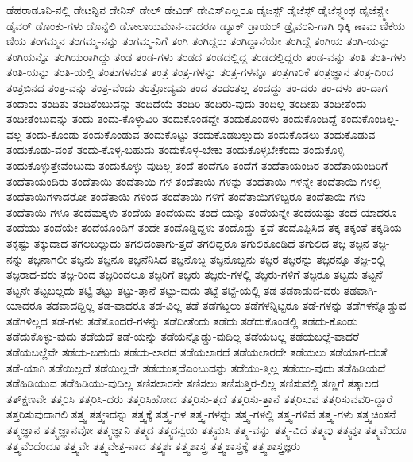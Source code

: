 {ಡೆಹರಾಡೂನಿ-ನಲ್ಲಿ
ಡೇಟನ್ನಿನ
ಡೇನಿಸ್
ಡೇಲ್
ಡೇವಿಡ್
ಡೇವಿಸ್ಎಲ್ಲರೂ
ಡೈಜಸ್ಟ್
ಡೈಜೆಸ್ಟ್
ಡೈಜೆಸ್ಟ್ನಂಥ
ಡೈಜೆಸ್ಟ್ಮೇ
ಡೈವರ್
ಡೊಂಕು-ಗಳು
ಡೊನ್ನೆಲಿ
ಡೋಲಾಯಮಾನ-ವಾದರೂ
ಡ್ಯೂಕ್
ಡ್ರಾಯರ್
ಡ್ರೈವರನಿ-ಗಾಗಿ
ಢಿಕ್ಕಿ
ಣಾಮ
ಣಿಕೆಯ
ಣಿಯ
ತಂಗಮ್ಮನ
ತಂಗಮ್ಮ-ನನ್ನು
ತಂಗಮ್ಮ-ನಿಗೆ
ತಂಗಿ
ತಂಗಿದ್ದರು
ತಂಗಿದ್ದಾನೆಯೇ
ತಂಗಿದ್ದೆ
ತಂಗಿಯ
ತಂಗಿ-ಯನ್ನು
ತಂಗಿಯನ್ನೊ
ತಂಗಿಯರಾಗಿದ್ದು
ತಂಡ
ತಂಡ-ಗಳು
ತಂಡದ
ತಂಡದಲ್ಲಿದ್ದ
ತಂಡದಲ್ಲಿದ್ದರು
ತಂಡ-ವನ್ನು
ತಂತಿ
ತಂತಿ-ಗಳು
ತಂತಿ-ಯನ್ನು
ತಂತಿ-ಯಲ್ಲಿ
ತಂತುಗಳನಂತ
ತಂತ್ರ
ತಂತ್ರ-ಗಳನ್ನು
ತಂತ್ರ-ಗಳನ್ನೂ
ತಂತ್ರಗಾರಿಕೆ
ತಂತ್ರಜ್ಞಾನ
ತಂತ್ರ-ದಿಂದ
ತಂತ್ರಬಿನದ
ತಂತ್ರ-ವನ್ನು
ತಂತ್ರ-ವೆಂದು
ತಂತ್ರೋದ್ಯಮ
ತಂದ
ತಂದಂತಲ್ಲ
ತಂದದ್ದು
ತಂ-ದರು
ತಂ-ದಳು
ತಂ-ದಾಗ
ತಂದಾರು
ತಂದಿತು
ತಂದಿತೆಂಬುದನ್ನು
ತಂದಿದೆಯೆ
ತಂದಿರಿ
ತಂದಿರು-ವುದು
ತಂದಿಲ್ಲ
ತಂದೀತು
ತಂದೀತೆಂದು
ತಂದೀತೆಂಬುದನ್ನು
ತಂದು
ತಂದು-ಕೊಳ್ಳುವಿರಿ
ತಂದುಕೊಂಡದ್ದೇ
ತಂದುಕೊಂಡಳು
ತಂದುಕೊಂಡಿದ್ದೆ
ತಂದುಕೊಂಡಿಲ್ಲ-ವಲ್ಲ
ತಂದು-ಕೊಂಡು
ತಂದುಕೊಂಡುವ
ತಂದುಕೊಟ್ಟು
ತಂದುಕೊಡಬಲ್ಲುದು
ತಂದುಕೊಡಲು
ತಂದುಕೊಡುವ
ತಂದುಕೊಡು-ವಂತೆ
ತಂದು-ಕೊಳ್ಳ-ಬಹುದು
ತಂದುಕೊಳ್ಳ-ಬೇಕು
ತಂದುಕೊಳ್ಳಬೇಕೆಂದು
ತಂದುಕೊಳ್ಳಿ
ತಂದುಕೊಳ್ಳುತ್ತೇವೆಂಬುದು
ತಂದುಕೊಳ್ಳು-ವುದಿಲ್ಲ
ತಂದೆ
ತಂದೆಗೂ
ತಂದೆಗೆ
ತಂದೆತಾಯಂದಿರ
ತಂದೆತಾಯಂದಿರಿಗೆ
ತಂದೆತಾಯಂದಿರು
ತಂದೆತಾಯಿ
ತಂದೆತಾಯಿ-ಗಳ
ತಂದೆತಾಯಿ-ಗಳನ್ನು
ತಂದೆತಾಯಿ-ಗಳನ್ನೇ
ತಂದೆತಾಯಿ-ಗಳಲ್ಲಿ
ತಂದೆತಾಯಿಗಳಾದರೋ
ತಂದೆತಾಯಿ-ಗಳಿಂದ
ತಂದೆತಾಯಿ-ಗಳಿಗೆ
ತಂದೆತಾಯಿಗಳಿಬ್ಬರೂ
ತಂದೆತಾಯಿ-ಗಳು
ತಂದೆತಾಯಿ-ಗಳೂ
ತಂದೆಮಕ್ಕಳು
ತಂದೆಯ
ತಂದೆಯದು
ತಂದೆ-ಯನ್ನು
ತಂದೆಯನ್ನೇ
ತಂದೆಯಷ್ಟು
ತಂದೆ-ಯಾದರೂ
ತಂದೆಯು
ತಂದೆಯೇ
ತಂದೆಯೊಂದಿಗೆ
ತಂದೇ
ತಂದೊಡ್ಡಿದ್ದಳು
ತಂದೊಡ್ಡು-ತ್ತವೆ
ತಂದೊಪ್ಪಿಸಿದ
ತಕ್ಕ
ತಕ್ಕಂತೆ
ತಕ್ಕಡಿಯ
ತಕ್ಕಷ್ಟು
ತಕ್ಕುದಾದ
ತಗಲಬಲ್ಲುದು
ತಗಲಿದಂತಾಗು-ತ್ತದೆ
ತಗಲಿದ್ದರೂ
ತಗುಲಿಕೊಂಡಿದೆ
ತಗುಲಿದ
ತಜ್ಞ
ತಜ್ಞನ
ತಜ್ಞ-ನನ್ನು
ತಜ್ಞನಾಗಲೀ
ತಜ್ಞನು
ತಜ್ಞನೂ
ತಜ್ಞನೆನಿಸಿದ
ತಜ್ಞನೊಬ್ಬ
ತಜ್ಞನೊಬ್ಬನು
ತಜ್ಞರ
ತಜ್ಞರನ್ನು
ತಜ್ಞರನ್ನೂ
ತಜ್ಞ-ರಲ್ಲಿ
ತಜ್ಞರಾದ-ವರು
ತಜ್ಞ-ರಿಂದ
ತಜ್ಞರಿಂದಲೂ
ತಜ್ಞರಿಗೆ
ತಜ್ಞರು
ತಜ್ಞರು-ಗಳಲ್ಲಿ
ತಜ್ಞರು-ಗಳಿಗೆ
ತಜ್ಞರೂ
ತಟ್ಟದು
ತಟ್ಟನೆ
ತಟ್ಟನೇ
ತಟ್ಟಬಲ್ಲದು
ತಟ್ಟಿ
ತಟ್ಟು
ತಟ್ಟು-ತ್ತಾನೆ
ತಟ್ಟು-ವುದು
ತಟ್ಟೆ
ತಟ್ಟೆ-ಯಲ್ಲಿ
ತಡ
ತಡಕಾಡುವ-ವರು
ತಡವಾಗಿ-ಯಾದರೂ
ತಡವಾದದ್ದಿಲ್ಲ
ತಡ-ವಾದರೂ
ತಡ-ವಿಲ್ಲ
ತಡೆ
ತಡೆಗಟ್ಟಲು
ತಡೆಗಳನ್ನಿಟ್ಟರೂ
ತಡೆ-ಗಳನ್ನು
ತಡೆಗಳನ್ನೊಡ್ಡುವ
ತಡೆಗಳಿಲ್ಲದ
ತಡೆ-ಗಳು
ತಡೆತೊಂದರೆ-ಗಳನ್ನು
ತಡೆದೀತೆಂದು
ತಡೆದು
ತಡೆದುಕೊಂಡಲ್ಲಿ
ತಡೆದು-ಕೊಂಡು
ತಡೆದುಕೊಳ್ಳು-ವುದು
ತಡೆಯದೆ
ತಡೆ-ಯನ್ನು
ತಡೆಯನ್ನೊಡ್ಡು-ವುದಿಲ್ಲ
ತಡೆಯಬಲ್ಲ
ತಡೆಯಬಲ್ಲೆ-ವಾದರೆ
ತಡೆಯಬಲ್ಲೆವೇ
ತಡೆಯ-ಬಹುದು
ತಡೆಯ-ಲಾರದ
ತಡೆಯಲಾರದೆ
ತಡೆಯಲಾರದೇ
ತಡೆಯಲು
ತಡೆಯಾಗ-ದಂತೆ
ತಡೆ-ಯಾಗಿ
ತಡೆಯಿಲ್ಲದೆ
ತಡೆಯಿಲ್ಲದೇ
ತಡೆಯುತ್ತದೆಎಂಬುದನ್ನು
ತಡೆಯು-ತ್ತಿಲ್ಲ
ತಡೆಯು-ವುದು
ತಡೆಹಿಡಿಯದೆ
ತಡೆಹಿಡಿಯುವ
ತಡೆಹಿಡಿಯು-ವುದಿಲ್ಲ
ತಣಿಸಲಾರನೇ
ತಣಿಸಲು
ತಣಿಸುತ್ತಿರ-ಲಿಲ್ಲ
ತಣಿಸುವಲ್ಲಿ
ತಣ್ಣಗೆ
ತತ್ಕಾಲದ
ತತ್ಕ್ಷಣವೇ
ತತ್ತರಿಸಿ
ತತ್ತರಿಸಿ-ದರು
ತತ್ತರಿಸಿಹೋದ
ತತ್ತರಿಸು-ತ್ತದೆ
ತತ್ತರಿಸು-ತ್ತಾನೆ
ತತ್ತರಿಸುವ
ತತ್ತರಿಸುವವರಿ-ದ್ದಾರೆ
ತತ್ತರಿಸುವುದಾಗಲಿ
ತತ್ತ್ವ
ತತ್ತ್ವಇದನ್ನು
ತತ್ತ್ವಕ್ಕೆ
ತತ್ತ್ವ-ಗಳ
ತತ್ತ್ವ-ಗಳನ್ನು
ತತ್ತ್ವ-ಗಳಲ್ಲಿ
ತತ್ತ್ವ-ಗಳಿವೆ
ತತ್ತ್ವ-ಗಳು
ತತ್ತ್ವಚಿಂತನೆ
ತತ್ತ್ವಜ್ಞಾನ
ತತ್ತ್ವಜ್ಞಾನವೋ
ತತ್ತ್ವಜ್ಞಾನಿ
ತತ್ತ್ವದ
ತತ್ತ್ವದನ್ವಯ
ತತ್ತ್ವಮಸಿ
ತತ್ತ್ವ-ವನ್ನು
ತತ್ತ್ವ-ವಿದೆ
ತತ್ತ್ವವು
ತತ್ತ್ವವೂ
ತತ್ತ್ವವೆಂದೂ
ತತ್ತ್ವವೆಂದೆಂದೂ
ತತ್ತ್ವವೇ
ತತ್ತ್ವವೇತ್ತ-ನಾದ
ತತ್ತ್ವಶಃ
ತತ್ತ್ವಶಾಸ್ತ್ರ
ತತ್ತ್ವಶಾಸ್ತ್ರಕ್ಕೆ
ತತ್ತ್ವಶಾಸ್ತ್ರಜ್ಞರು
}
